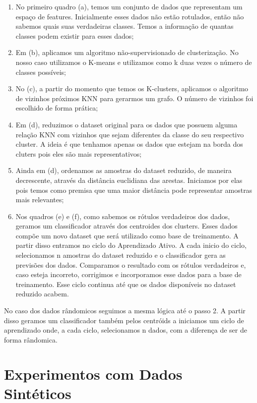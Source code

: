\begin{enumerate}
  \item No primeiro quadro (a), temos um conjunto de dados que representam um espaço de features. Inicialmente esses dados não estão rotulados, então não sabemos quais suas verdadeiras classes. Temos a informação de quantas classes podem existir para esses dados;
  \item Em (b), aplicamos um algoritmo não-supervisionado de clusterização. No nosso caso utilizamos o K-means e utilizamos como k duas vezes o número de classes possíveis;
  \item No (c), a partir do momento que temos os K-clusters, aplicamos o algoritmo de vizinhos próximos KNN para gerarmos um grafo. O número de vizinhos foi escolhido de forma prática;
  \item Em (d), reduzimos o dataset original para os dados que possuem alguma relação KNN com vizinhos que sejam diferentes da classe do seu respectivo cluster. A ideia é que tenhamos apenas os dados que estejam na borda dos cluters pois eles são mais representativos;
  \item Ainda em (d), ordenamos as amostras do dataset reduzido, de maneira decrescente, através da distância euclidiana das arestas. Iniciamos por elas pois temos como premisa que uma maior distância pode representar amostras mais relevantes;
  \item Nos quadros (e) e (f), como sabemos os rótulos verdadeiros dos dados, geramos um classificador através dos centroides dos clusters. Esses dados compõe um novo dataset que será utilizado como base de treinamento. A partir disso entramos no ciclo do Aprendizado Ativo. A cada inicio do ciclo, selecionamos n amostras do dataset reduzido e o classificador gera as previsões dos dados. Comparamos o resultado com os rótulos verdadeiros e, caso esteja incorreto, corrigimos e incorporamos esse dados para a base de treinamento. Esse ciclo continua até que os dados disponíveis no dataset reduzido acabem. 
\end{enumerate}

No caso dos dados rândomicos seguimos a mesma lógica até o passo 2. A partir disso geramos um classificador também pelos centróids a iniciamos um ciclo de aprendizado onde, a cada ciclo, selecionamos n dados, com a diferença de ser de forma rândomica.

\section{Experimentos com Dados Sintéticos}
\label{sec:experimentos_sinteticos}

